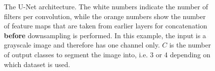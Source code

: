 \begin {figure}[!ht]
	\scalebox{0.75}{}
	\caption[The U-Net architecture.]{The U-Net architecture. The white numbers indicate the number of filters per convolution, while the orange numbers show the number of feature maps that are taken from earlier layers for concatenation \textbf{before} downsampling is performed. In this example, the input is a grayscale image and therefore has one channel only. $C$ is the number of output classes to segment the image into, i.e. 3 or 4 depending on which dataset is used.}
	\label{fig:unet_arch}
\end {figure}
